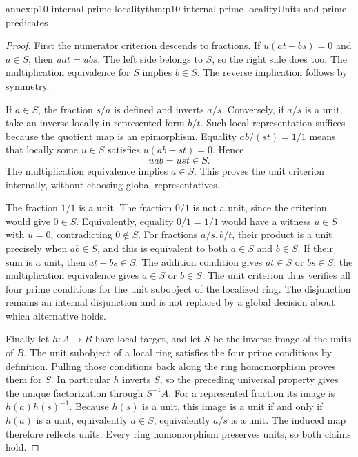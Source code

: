\begin{annexitem}{annex:p10-internal-prime-locality}{thm:p10-internal-prime-locality}{Units and prime predicates}
\begin{proof}
First the numerator criterion descends to fractions.
If \(u(at-bs)=0\) and \(a\in S\), then \(uat=ubs\).
The left side belongs to \(S\), so the right side does too.
The multiplication equivalence for \(S\) implies \(b\in S\).
The reverse implication follows by symmetry.

If \(a\in S\), the fraction \(s/a\) is defined and inverts
\(a/s\). Conversely, if \(a/s\) is a unit, take an inverse
locally in represented form \(b/t\). Such local representation
suffices because the quotient map is an epimorphism.
Equality \(ab/(st)=1/1\) means that locally some \(u\in S\)
satisfies \(u(ab-st)=0\). Hence
\[
 uab=ust\in S.
\]
The multiplication equivalence implies \(a\in S\).
This proves the unit criterion internally, without choosing
global representatives.

The fraction \(1/1\) is a unit. The fraction \(0/1\) is not
a unit, since the criterion would give \(0\in S\).
Equivalently, equality \(0/1=1/1\) would have a witness
\(u\in S\) with \(u=0\), contradicting \(0\notin S\).
For fractions \(a/s,b/t\), their product is a unit precisely
when \(ab\in S\), and this is equivalent to both \(a\in S\)
and \(b\in S\). If their sum is a unit, then \(at+bs\in S\).
The addition condition gives \(at\in S\) or \(bs\in S\);
the multiplication equivalence gives \(a\in S\) or \(b\in S\).
The unit criterion thus verifies all four prime conditions
for the unit subobject of the localized ring. The disjunction
remains an internal disjunction and is not replaced by a
global decision about which alternative holds.

Finally let \(h:A\to B\) have local target, and let \(S\)
be the inverse image of the units of \(B\).
The unit subobject of a local ring satisfies the four prime
conditions by definition. Pulling those conditions back along
the ring homomorphism proves them for \(S\).
In particular \(h\) inverts \(S\), so the preceding universal
property gives the unique factorization through \(S^{-1}A\).
For a represented fraction its image is \(h(a)h(s)^{-1}\).
Because \(h(s)\) is a unit, this image is a unit if and only
if \(h(a)\) is a unit, equivalently \(a\in S\), equivalently
\(a/s\) is a unit. The induced map therefore reflects units.
Every ring homomorphism preserves units, so both claims hold.
\end{proof}
\end{annexitem}
